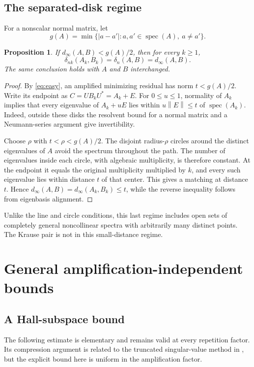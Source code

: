 \documentclass[11pt]{article}
\newtheorem{proposition}[theorem]{Proposition}
\theoremstyle{definition}\newtheorem{definition}[theorem]{Definition}
\theoremstyle{remark}\newtheorem{remark}[theorem]{Remark}
\newcommand{\spec}{\operatorname{spec}}
\newcommand{\norm}[1]{\left\lVert#1\right\rVert}
\newcommand{\dd}{\delta}
\newcommand{\dm}{d_\infty}
\begin{document}
\subsection{The separated-disk regime}
For a nonscalar normal matrix, let
\[
 g(A)=\min\{|a-a'|:a,a'\in\spec(A),\ a\ne a'\}.
\]
\begin{proposition}\label{prop:local}
If $\dm(A,B)<g(A)/2$, then for every $k\ge1$,
\[
 \dd_{nk}(A_k,B_k)=\dd_n(A,B)=\dm(A,B).
\]
The same conclusion holds with $A$ and $B$ interchanged.
\end{proposition}
\begin{proof}
By \eqref{eq:easy}, an amplified minimizing residual has norm $t<g(A)/2$. Write its endpoint as $C=UB_kU^*=A_k+E$. For $0\le u\le1$, normality of $A_k$ implies that every eigenvalue of $A_k+uE$ lies within $u\norm E\le t$ of $\spec(A_k)$. Indeed, outside these disks the resolvent bound for a normal matrix and a Neumann-series argument give invertibility.

Choose $\rho$ with $t<\rho<g(A)/2$. The disjoint radius-$\rho$ circles around the distinct eigenvalues of $A$ avoid the spectrum throughout the path. The number of eigenvalues inside each circle, with algebraic multiplicity, is therefore constant. At the endpoint it equals the original multiplicity multiplied by $k$, and every such eigenvalue lies within distance $t$ of that center. This gives a matching at distance $t$. Hence $\dm(A,B)=\dm(A_k,B_k)\le t$, while the reverse inequality follows from eigenbasis alignment. 
\end{proof}

Unlike the line and circle conditions, this last regime includes open sets of completely general noncollinear spectra with arbitrarily many distinct points. The Krause pair is not in this small-distance regime.

\section{General amplification-independent bounds}
\subsection{A Hall-subspace bound}
The following estimate is elementary and remains valid at every repetition factor. Its compression argument is related to the truncated singular-value method in \cite{tang}, but the explicit bound here is uniform in the amplification factor.
\end{document}
